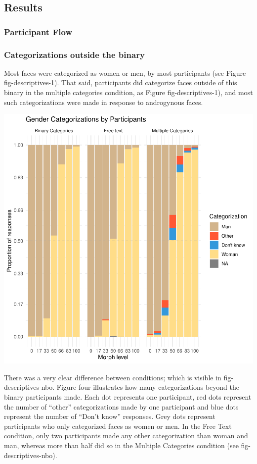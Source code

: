 \documentclass[
  man,
  longtable,
  nolmodern,
  notxfonts,
  notimes,
  colorlinks=true,linkcolor=blue,citecolor=blue,urlcolor=blue]{apa7}
\begin{document}
\subsection{Results}\label{results-1}

\subsubsection{Participant Flow}\label{participant-flow-1}

\subsubsection{Categorizations outside the
binary}\label{categorizations-outside-the-binary}

Most faces were categorized as women or men, by most participants (see
Figure fig-descriptives-1). That said, participants did categorize faces
outside of this binary in the multiple categories condition, as Figure
fig-descriptives-1), and most such categorizations were made in response
to androgynous faces.

\includegraphics{quarto_test_files/figure-pdf/label - fig-descriptives-1fig.cap- Gender Categorizations by Participants-1.pdf}

There was a very clear difference between conditions; which is visible
in fig-descriptives-nbo. Figure four illustrates how many
categorizations beyond the binary participants made. Each dot represents
one participant, red dots represent the number of ``other''
categorizations made by one participant and blue dots represent the
number of ``Don't know'' responses. Grey dots represent participants who
only categorized faces as women or men. In the Free Text condition, only
two participants made any other categorization than woman and man,
whereas more than half did so in the Multiple Categories condition (see
fig-descriptives-nbo).
\end{document}
